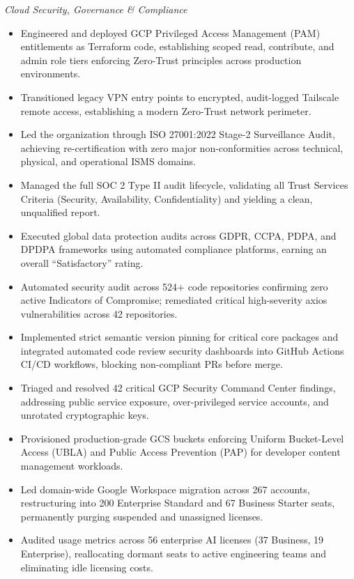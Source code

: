 \documentclass[10pt, letterpaper]{article}
\newenvironment{highlights}{
    \begin{itemize}[
        topsep=0.10 cm,
        parsep=0.10 cm,
        partopsep=0pt,
        itemsep=0pt,
        leftmargin=0 cm + 10pt
    ]
}{
    \end{itemize}
}
\begin{document}
\vspace{0.10 cm}
\textit{Cloud Security, Governance \& Compliance}
\begin{highlights}
    \item Engineered and deployed GCP Privileged Access Management (PAM) entitlements as Terraform code, establishing scoped read, contribute, and admin role tiers enforcing Zero-Trust principles across production environments.
    \item Transitioned legacy VPN entry points to encrypted, audit-logged Tailscale remote access, establishing a modern Zero-Trust network perimeter.
    \item Led the organization through ISO 27001:2022 Stage-2 Surveillance Audit, achieving re-certification with zero major non-conformities across technical, physical, and operational ISMS domains.
    \item Managed the full SOC 2 Type II audit lifecycle, validating all Trust Services Criteria (Security, Availability, Confidentiality) and yielding a clean, unqualified report.
    \item Executed global data protection audits across GDPR, CCPA, PDPA, and DPDPA frameworks using automated compliance platforms, earning an overall ``Satisfactory'' rating.
    \item Automated security audit across 524+ code repositories confirming zero active Indicators of Compromise; remediated critical high-severity axios vulnerabilities across 42 repositories.
    \item Implemented strict semantic version pinning for critical core packages and integrated automated code review security dashboards into GitHub Actions CI/CD workflows, blocking non-compliant PRs before merge.
    \item Triaged and resolved 42 critical GCP Security Command Center findings, addressing public service exposure, over-privileged service accounts, and unrotated cryptographic keys.
    \item Provisioned production-grade GCS buckets enforcing Uniform Bucket-Level Access (UBLA) and Public Access Prevention (PAP) for developer content management workloads.
    \item Led domain-wide Google Workspace migration across 267 accounts, restructuring into 200 Enterprise Standard and 67 Business Starter seats, permanently purging suspended and unassigned licenses.
    \item Audited usage metrics across 56 enterprise AI licenses (37 Business, 19 Enterprise), reallocating dormant seats to active engineering teams and eliminating idle licensing costs.

\end{highlights}
\end{document}
